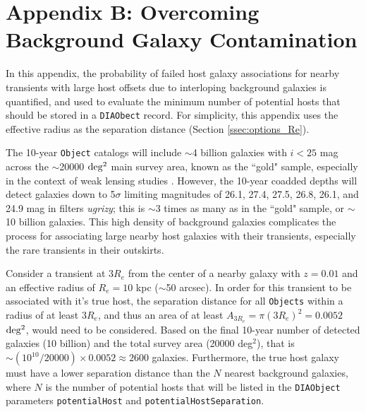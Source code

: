 \section{Appendix B: Overcoming Background Galaxy Contamination}\label{sec:appB}

In this appendix, the probability of failed host galaxy associations for nearby transients with large host offsets due to interloping background galaxies is quantified, and used to evaluate the minimum number of potential hosts that should be stored in a {\tt DIAObect} record. 
For simplicity, this appendix uses the effective radius as the separation distance (Section \ref{ssec:options_Re}).

The 10-year {\tt Object} catalogs will include $\sim$4 billion galaxies with $i<25$ mag across the $\sim$20000 $\rm deg^2$ main survey area, known as the ``gold" sample, especially in the context of weak lensing studies .
However, the 10-year coadded depths will detect galaxies down to 5$\sigma$ limiting magnitudes of 26.1, 27.4, 27.5, 26.8, 26.1, and 24.9 mag in filters {\it ugrizy}; this is $\sim$3 times as many as in the ``gold" sample, or $\sim$10 billion galaxies.
This high density of background galaxies complicates the process for associating large nearby host galaxies with their transients, especially the rare transients in their outskirts.

Consider a transient at $3R_e$ from the center of a nearby galaxy with $z=0.01$ and an effective radius of $R_e = 10$ kpc ($\sim$50 arcsec).
In order for this transient to be associated with it's true host, the separation distance for all {\tt Objects} within a radius of at least $3R_e$, and thus an area of at least $A_{3R_e} = \pi (3R_e)^2 = 0.0052$ $\rm deg^2$, would need to be considered.
Based on the final 10-year number of detected galaxies (10 billion) and the total survey area (20000 deg$^2$), that is $\sim (10^10 / 20000) \times 0.0052 \approx 2600$ galaxies.
Furthermore, the true host galaxy must have a lower separation distance than the $N$ nearest background galaxies, where $N$ is the number of potential hosts that will be listed in the {\tt DIAObject} parameters {\tt potentialHost} and {\tt potentialHostSeparation}.

